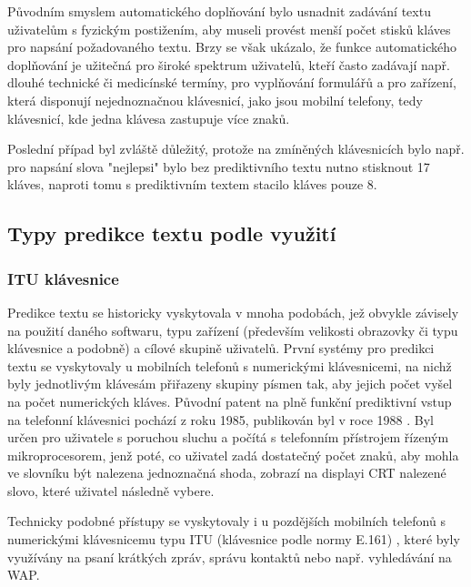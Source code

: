 \documentclass{article}
\begin{document}
Původním smyslem automatického doplňování bylo usnadnit zadávání textu uživatelům s fyzickým postižením, aby museli provést menší počet stisků kláves pro napsání požadovaného textu. Brzy se však ukázalo, že funkce automatického doplňování je užitečná pro široké spektrum uživatelů, kteří často zadávají např. dlouhé technické či medicínské termíny, pro vyplňování formulářů a pro zařízení, která disponují nejednoznačnou klávesnicí, jako jsou mobilní telefony, tedy klávesnicí, kde jedna klávesa zastupuje více znaků. 

Poslední případ byl zvláště důležitý, protože na zmíněných klávesnicích bylo např. pro napsání slova "nejlepsi" bylo bez prediktivního textu nutno stisknout 17 kláves, naproti tomu s prediktivním textem stacilo kláves pouze 8. \cite{dXVv6nPb2KifFXYv}

\subsection{Typy predikce textu podle využití}

\subsubsection{ITU klávesnice}

Predikce textu se historicky vyskytovala v mnoha podobách, jež obvykle závisely na použití daného softwaru, typu zařízení (především velikosti obrazovky či typu klávesnice a podobně) a cílové skupině uživatelů. První systémy pro predikci textu se vyskytovaly u mobilních telefonů s numerickými klávesnicemi, na nichž byly jednotlivým klávesám přiřazeny skupiny písmen tak, aby jejich počet vyšel na počet numerických kláves. Původní patent na plně funkční prediktivní vstup na telefonní klávesnici pochází z roku 1985, publikován byl v roce 1988 \cite{Feinson1988}. Byl určen pro uživatele s poruchou sluchu a počítá s telefonním přístrojem řízeným mikroprocesorem, jenž poté, co uživatel zadá dostatečný počet znaků, aby mohla ve slovníku být nalezena jednoznačná shoda, zobrazí na displayi CRT nalezené slovo, které uživatel následně vybere.

Technicky podobné přístupy se vyskytovaly i u pozdějších mobilních telefonů s numerickými klávesnicemu typu ITU (klávesnice podle normy E.161) \cite{mfmtlqoxL48pMk3T}, které byly využívány na psaní krátkých zpráv, správu kontaktů nebo např. vyhledávání na WAP. 
\end{document}
